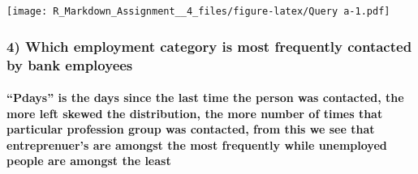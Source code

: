 \documentclass[]{article}
\newenvironment{Shaded}{\begin{snugshade}}{\end{snugshade}}
\newcommand{\KeywordTok}[1]{\textcolor[rgb]{0.13,0.29,0.53}{\textbf{#1}}}
\newcommand{\DataTypeTok}[1]{\textcolor[rgb]{0.13,0.29,0.53}{#1}}
\newcommand{\DecValTok}[1]{\textcolor[rgb]{0.00,0.00,0.81}{#1}}
\newcommand{\StringTok}[1]{\textcolor[rgb]{0.31,0.60,0.02}{#1}}
\newcommand{\OperatorTok}[1]{\textcolor[rgb]{0.81,0.36,0.00}{\textbf{#1}}}
\newcommand{\NormalTok}[1]{#1}
\let\oldparagraph\paragraph
\renewcommand{\paragraph}[1]{\oldparagraph{#1}\mbox{}}
\begin{document}
\begin{Shaded}
\end{Shaded}

\texttt{[image: R\_Markdown\_Assignment\_\_4\_files/figure-latex/Query a-1.pdf]}

\subsubsection{4) Which employment category is most frequently contacted
by bank
employees}\label{which-employment-category-is-most-frequently-contacted-by-bank-employees}

\paragraph{\texorpdfstring{``Pdays'' is the days since the last time the
person was contacted, the more left skewed the distribution, the more
number of times that particular profession group was contacted, from
this we see that entreprenuer's are amongst the most frequently while
unemployed people are amongst the
least}{Pdays is the days since the last time the person was contacted, the more left skewed the distribution, the more number of times that particular profession group was contacted, from this we see that entreprenuer's are amongst the most frequently while unemployed people are amongst the least}}\label{pdays-is-the-days-since-the-last-time-the-person-was-contacted-the-more-left-skewed-the-distribution-the-more-number-of-times-that-particular-profession-group-was-contacted-from-this-we-see-that-entreprenuers-are-amongst-the-most-frequently-while-unemployed-people-are-amongst-the-least}
\end{document}
